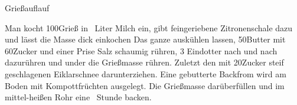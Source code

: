 \begin{recipe}[\vegetarian]{Grießauflauf}
%
%
%

\begin{ingredients}
\end{ingredients}

\begin{instructions}
    Man kocht 100\gram Grieß in \half\ Liter Milch ein, gibt feingeriebene Zitronenschale dazu und lässt die Masse dick einkochen
    Das ganze auskühlen lassen, 50\gram Butter mit 60\gram Zucker und einer Prise Salz schaumig rühren, 3 Eindotter nach und nach dazurühren und under die Grießmasse rühren.
    Zuletzt den mit 20\gram Zucker steif geschlagenen Eiklarschnee darunterziehen.
    Eine gebutterte Backfrom wird am Boden mit Kompottfrüchten ausgelegt.
    Die Grießmasse darüberfüllen und im mittel-heißen Rohr eine \threequarter\ Stunde backen.
\end{instructions}
\end{recipe}
